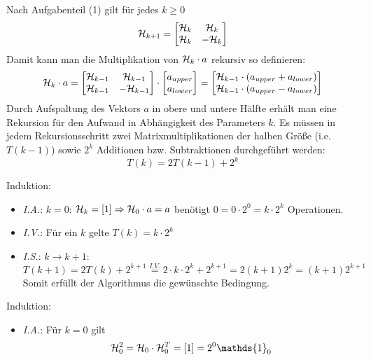 \begin{flushenum}
	\item Nach Aufgabenteil (1) gilt für jedes $k \geq 0$
	\[ \mathcal{H}_{k+1} = \begin{bmatrix}
		\mathcal{H}_k & \mathcal{H}_k \\
		\mathcal{H}_k & -\mathcal{H}_k \\
	\end{bmatrix} \]
	Damit kann man die Multiplikation von $\mathcal{H}_k \cdot a$ rekursiv so definieren:
	\[ \mathcal{H}_k \cdot a = 
	\begin{bmatrix}
		\mathcal{H}_{k-1} & \mathcal{H}_{k-1} \\
		\mathcal{H}_{k-1} & -\mathcal{H}_{k-1} \\
	\end{bmatrix} \cdot
	\begin{bmatrix}
		a_{upper} \\
		a_{lower}
	\end{bmatrix} = 
	\begin{bmatrix}
		\mathcal{H}_{k-1} \cdot (a_{upper} + a_{lower}) \\
		\mathcal{H}_{k-1} \cdot (a_{upper} - a_{lower}) \\
	\end{bmatrix} \]
	Durch Aufspaltung des Vektors $a$ in obere und untere Hälfte erhält man
	eine Rekursion für den Aufwand in Abhängigkeit des Parameters $k$. Es
	müssen in jedem Rekursions\-schritt zwei Matrixmultiplikationen der
	halben Größe (i.e. $T(k-1)$) sowie $2^k$ Additionen bzw. Subtraktionen
	durchgeführt werden:
	\[ T(k) = 2 T(k-1) + 2^k \]

	\pagebreak

	Induktion:
	\begin{itemize}
		\item \textit{I.A.}: $k = 0$: $\mathcal{H}_k = [1] \Rightarrow \mathcal{H}_0 \cdot a = a$ benötigt $0 = 0\cdot 2^0 = k\cdot 2^k$ Operationen.

		\item \textit{I.V.}: Für ein $k$ gelte $T(k) = k\cdot 2^k$

		\item \textit{I.S.}: $k \rightarrow k + 1$:
			\[T(k+1) = 2 T(k) + 2^{k+1} \overset{I.V.}{=} 2\cdot k\cdot 2^k + 2^{k+1} = 2 (k+1)2^k = (k+1) 2^{k+1} \]
			Somit erfüllt der Algorithmus die gewünschte Bedingung.
	\end{itemize}

	\item Induktion:
		\begin{itemize}
			\item \textit{I.A.}: Für $k = 0$ gilt 
				\[ \H_0^2 = \H_0 \cdot \H_0^T = [1] = 2^0 \mathds{1}_0\]
	

\end{itemize}
\end{flushenum}
